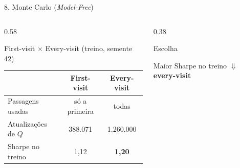 \documentclass[aspectratio=169,10pt,t]{beamer}
\newenvironment{altura}[2][c]{\begin{minipage}[t][#2][#1]{\linewidth}}{\end{minipage}}
\begin{document}
\begin{frame}{8. Monte Carlo (\textit{Model-Free})}
  \begin{columns}[T,onlytextwidth]
    \begin{column}{0.58\textwidth}
      \begin{block}{First-visit $\times$ Every-visit (treino, semente 42)}
        \begin{altura}{2.5cm}
        \centering\footnotesize
        \renewcommand{\arraystretch}{1.15}
        \begin{tabular}{l cc}
          \toprule
          & \textbf{First-visit} & \textbf{Every-visit} \\
          \midrule
          Passagens usadas      & só a primeira & todas \\
          Atualizações de $Q$   & 388.071       & 1.260.000 \\
          Sharpe no treino      & 1,12          & \textbf{1,20} \\
          \bottomrule
        \end{tabular}
        \end{altura}
      \end{block}
    \end{column}

    \begin{column}{0.38\textwidth}
      \begin{alertblock}{Escolha}
        \begin{altura}{2.5cm}
        \centering
        Maior Sharpe no treino
        \vskip 0.15cm
        $\Downarrow$
        \vskip 0.15cm
        \textbf{every-visit}
        \end{altura}
      \end{alertblock}
    \end{column}
  \end{columns}

\end{frame}
\end{document}
